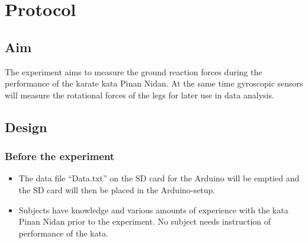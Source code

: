 \section{Protocol}
\subsection{Aim}
The experiment aims to measure the ground reaction forces during the performance of the karate kata Pinan Nidan. At the same time gyroscopic sensors will measure the rotational forces of the legs for later use in data analysis.

\subsection{Design}
\subsubsection{Before the experiment}
\begin{itemize}
\item The data file “Data.txt” on the SD card for the Arduino will be emptied and the SD card will then be placed in the Arduino-setup. 
\item Subjects have knowledge and various amounts of experience with the kata Pinan Nidan prior to the experiment. No subject needs instruction of performance of the kata.
\end{itemize}

